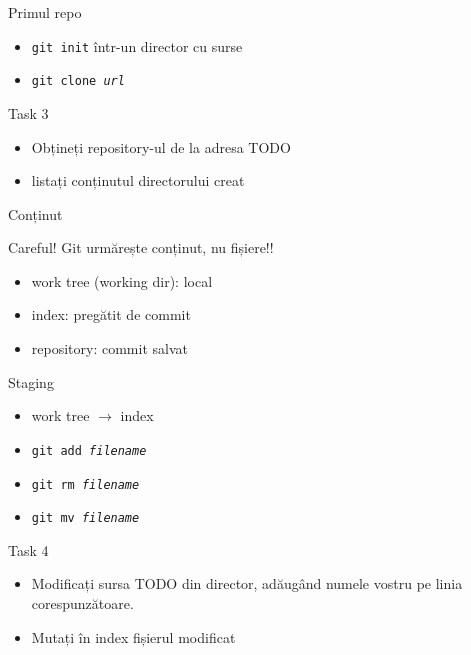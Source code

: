 \documentclass{beamer}
\begin{document}
\begin{frame}{Primul repo}
  \begin{itemize}
    \item \texttt{git init} într-un director cu surse
    \item \texttt{git clone \textit{url}}
  \end{itemize}
  \pause
  \begin{alertblock}{Task 3}
    \begin{itemize}
      \item Obțineți repository-ul de la adresa TODO
      \item listați conținutul directorului creat
    \end{itemize}
  \end{alertblock}
\end{frame}

\begin{frame}[label=Content]{Conținut}
  \begin{alertblock}{Careful!}
    Git urmărește conținut, nu fișiere!!
  \end{alertblock}
  \begin{itemize}
    \item work tree (working dir): local
    \item index: pregătit de commit
    \item repository: commit salvat
  \end{itemize}
\end{frame}

\begin{frame}{Staging}
  \begin{itemize}
    \item work tree $\rightarrow$ index
    \item \texttt{git add \textit{filename}}
    \item \texttt{git rm \textit{filename}}
    \item \texttt{git mv \textit{filename}}
  \end{itemize}
  \pause
  \begin{alertblock}{Task 4}
    \begin{itemize}
      \item Modificați sursa TODO din director, adăugând numele vostru pe linia
      corespunzătoare.
      \item Mutați în index fișierul modificat
    \end{itemize}
  \end{alertblock}
\end{frame}
\end{document}
